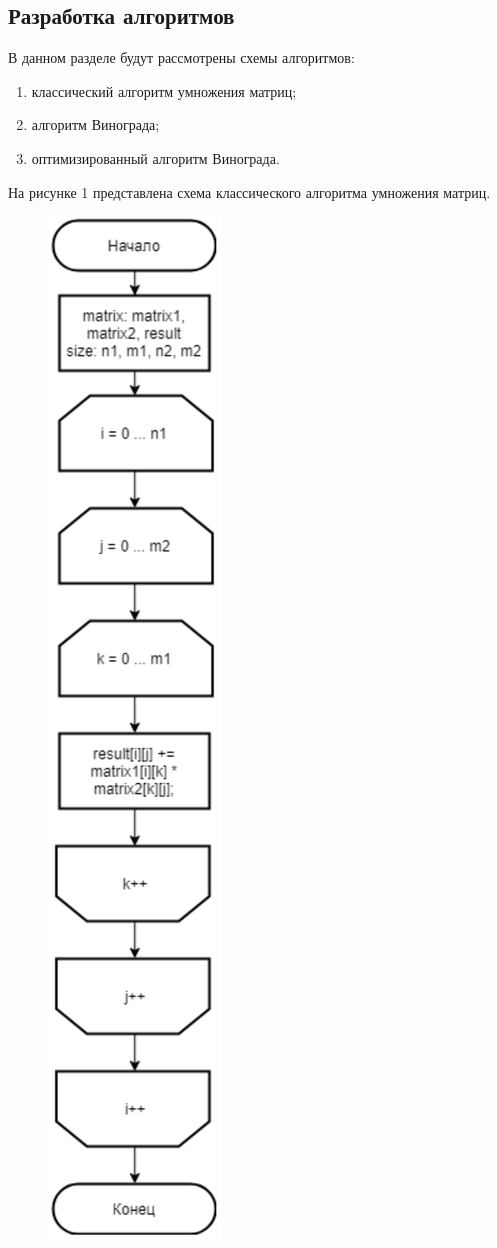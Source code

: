 \documentclass[a4paper, 12pt]{article}
\begin{document}
\begin{flushleft}
	\subsection{Разработка алгоритмов}
	В данном разделе будут рассмотрены схемы алгоритмов:
	\begin{enumerate}
		\item классический алгоритм умножения матриц;
		\item алгоритм Винограда;
		\item оптимизированный алгоритм Винограда.
	\end{enumerate}
	\clearpage
	\newpage
	\hspace*{5mm} На рисунке 1 представлена схема классического алгоритма умножения матриц.
	\begin{figure}[h!]
		\centering \includegraphics[scale=1.2]{classic}

\end{figure}
\end{flushleft}
\end{document}
